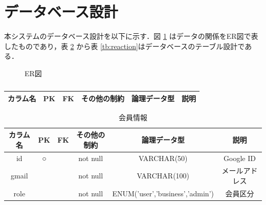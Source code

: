 \section{データベース設計}
本システムのデータベース設計を以下に示す．図 \ref{fig:sec8/er} はデータの関係をER図で表したものであり，表 \ref{tb:user} から表 \ref{tb:reaction}はデータベースのテーブル設計である．
\begin{figure}[H]
    \centering
    
    \caption{ER図}
    \label{fig:sec8/er}
\end{figure}

\begin{table}[H]
    \centering
    \caption{}
    \label{tb:}
    \begin{tabular}{|c|c|c|c|c|c|} \hline
        カラム名 & PK & FK & その他の制約 & 論理データ型 & 説明 \\ \hline\hline
    \end{tabular}
\end{table}
\fi

\begin{table}[H]
    \centering
    \caption{会員情報}
    \label{tb:user}
    \begin{tabular}{|c|c|c|c|c|c|} \hline
        カラム名 & PK & FK & その他の制約 & 論理データ型 & 説明 \\ \hline\hline
        id & ○ & & not null & VARCHAR(50) & Google ID \\ \hline
        gmail & & & not null & VARCHAR(100) & メールアドレス \\ \hline
        role & & & not null & ENUM('user','business','admin') & 会員区分 \\ \hline
    \end{tabular}
\end{table}

